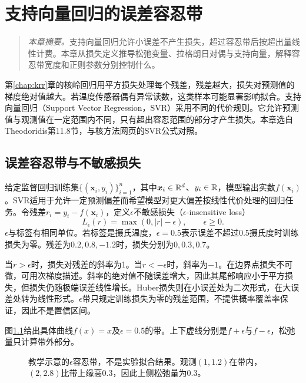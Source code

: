 \chapter{支持向量回归的误差容忍带}
\label{chap:svr}
\begin{quote}\small
\textit{本章摘要。}支持向量回归允许小误差不产生损失，超过容忍带后按超出量线性计费。本章从损失定义推导松弛变量、拉格朗日对偶与支持向量，解释容忍带宽度和正则参数分别控制什么。
\end{quote}

第\ref{chap:krr}章的核岭回归用平方损失处理每个残差，残差越大，损失对预测值的梯度绝对值越大。若温度传感器偶有异常读数，这类样本可能显著影响拟合。支持向量回归（Support Vector Regression，SVR）采用不同的代价规则。它允许预测值与观测值在一定范围内不同，只有超出容忍范围的部分才产生损失。本章选自Theodoridis第11.8节\cite{theodoridis2015ml}，与核方法网页的SVR公式对照\cite{zheng2021kernel}。

\section{误差容忍带与不敏感损失}
给定监督回归训练集$\{(\bm x_i,y_i)\}_{i=1}^n$，其中$\bm x_i\in\mathbb{R}^d$、$y_i\in\mathbb{R}$，模型输出实数$f(\bm x_i)$。SVR适用于允许一定预测偏差而希望模型对更大偏差按线性代价处理的回归任务。令残差$r_i=y_i-f(\bm x_i)$，定义$\epsilon$不敏感损失（$\epsilon$-insensitive loss）
\begin{equation}
 L_\epsilon(r)=\max(0,|r|-\epsilon),\qquad\epsilon\ge0.
 \label{eq:svr-insensitive-loss}
\end{equation}
$\epsilon$与标签有相同单位。若标签是摄氏温度，$\epsilon=0.5$表示误差不超过$0.5$摄氏度时训练损失为零。残差为$0.2,0.8,-1.2$时，损失分别为$0,0.3,0.7$。

当$r>\epsilon$时，损失对残差的斜率为1。当$r< -\epsilon$时，斜率为$-1$。在边界点损失不可微，可用次梯度描述。斜率的绝对值不随误差增大，因此其尾部响应小于平方损失，但损失仍随极端误差线性增长。Huber损失则在小误差处为二次形式，在大误差处转为线性形式。$\epsilon$带只规定训练损失为零的残差范围，不提供概率覆盖率保证，因此不是置信区间。

图\ref{fig:svr-tube}给出具体曲线$f(x)=x$及$\epsilon=0.5$的带。上下虚线分别是$f+\epsilon$与$f-\epsilon$，松弛量只计算带外部分。
\begin{figure}[htbp]
\centering
{}
\caption{教学示意的$\epsilon$容忍带，不是实验拟合结果。观测$(1,1.2)$在带内，$(2,2.8)$比带上缘高0.3，因此上侧松弛量为0.3。}
\label{fig:svr-tube}
\end{figure}


